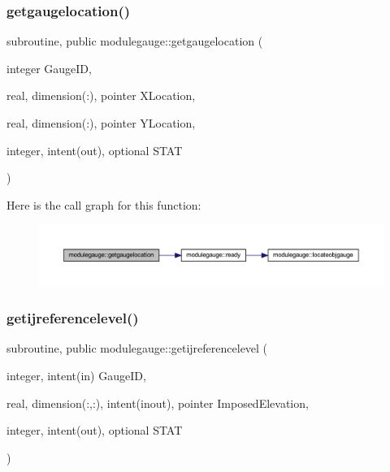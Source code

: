 \subsubsection{\texorpdfstring{getgaugelocation()}{getgaugelocation()}}
{\footnotesize\ttfamily subroutine, public modulegauge\+::getgaugelocation (\begin{DoxyParamCaption}\item[{integer}]{Gauge\+ID,  }\item[{real, dimension(\+:), pointer}]{X\+Location,  }\item[{real, dimension(\+:), pointer}]{Y\+Location,  }\item[{integer, intent(out), optional}]{S\+T\+AT }\end{DoxyParamCaption})}

Here is the call graph for this function\+:\nopagebreak
\begin{figure}[H]
\begin{center}
\leavevmode
\includegraphics[width=350pt]{namespacemodulegauge_a118b41963f151494a832cd94010c6282_cgraph}
\end{center}
\end{figure}
\mbox{\label{namespacemodulegauge_a9b801d4a79f8bfd52e8276c2b5525b5e}} 
\subsubsection{\texorpdfstring{getijreferencelevel()}{getijreferencelevel()}}
{\footnotesize\ttfamily subroutine, public modulegauge\+::getijreferencelevel (\begin{DoxyParamCaption}\item[{integer, intent(in)}]{Gauge\+ID,  }\item[{real, dimension(\+:,\+:), intent(inout), pointer}]{Imposed\+Elevation,  }\item[{integer, intent(out), optional}]{S\+T\+AT }\end{DoxyParamCaption})}

